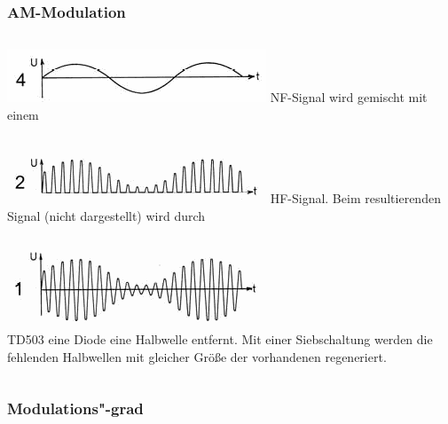 \begin{frame}
  \frametitle{AM-Modulation}

  \begin{columns}
    \includegraphics[width=\textwidth,height=.3\textheight,keepaspectratio]{a12/td503d.png}
    NF-Signal wird gemischt mit einem
  \end{columns}
  \begin{columns}
    \includegraphics[width=\textwidth,height=.3\textheight,keepaspectratio]{a12/td503b.png}
    HF-Signal. Beim resultierenden Signal (nicht dargestellt) wird durch
  \end{columns}
  \begin{columns}
    \includegraphics[width=\textwidth,height=.3\textheight,keepaspectratio]{a12/td503a.png}\\
    {\tiny TD503}
    eine Diode eine Halbwelle entfernt. Mit einer Siebschaltung werden die fehlenden Halbwellen mit gleicher Größe der vorhandenen regeneriert.
  \end{columns}
\end{frame}


\subsubsection{Modulations"-grad}

